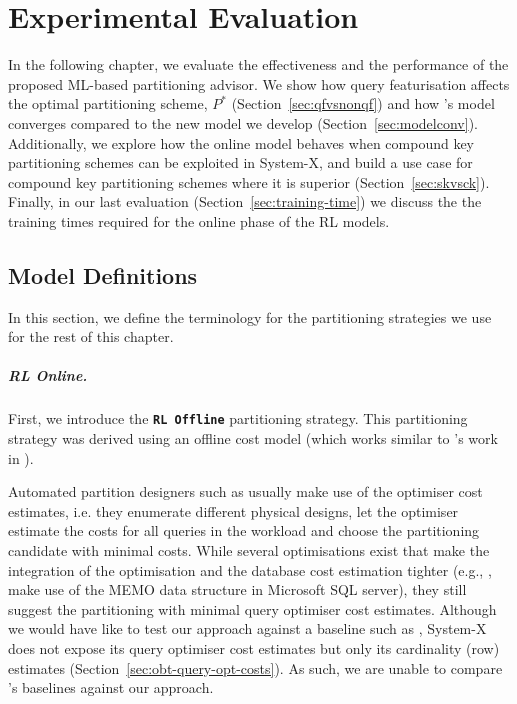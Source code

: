 \chapter{Experimental Evaluation}
\label{chapter:experimental-evaluation}
In the following chapter, we evaluate the effectiveness and the performance of the proposed ML-based partitioning advisor. We show how query featurisation affects the optimal partitioning scheme, $P^*$ (Section~\ref{sec:qfvsnonqf}) and how \citeauthor{Hilprecht:2019:TLP:3329859.3329876}'s model converges compared to the new model we develop (Section~\ref{sec:modelconv}). Additionally, we explore how the online model behaves when compound key partitioning schemes can be exploited in System-X, and build a use case for compound key partitioning schemes where it is superior (Section~\ref{sec:skvsck}). Finally, in our last evaluation (Section~\ref{sec:training-time}) we discuss the the training times required for the online phase of the RL models. 

\section{Model Definitions}
In this section, we define the terminology for the partitioning strategies we use for the rest of this chapter. 

\noindent\paragraph{RL Online.} First, we introduce the \textbf{\texttt{RL Offline}} partitioning strategy. This partitioning strategy was derived using  an offline cost model \cite{DBLP:conf/sigmod/HilprechtBR20} (which works similar to \citeauthor{DBLP:conf/sigmod/NehmeB11}'s work in \cite{DBLP:conf/sigmod/NehmeB11}). 

Automated partition designers such as \cite{DBLP:conf/sigmod/NehmeB11} usually make use of the optimiser cost estimates, i.e. they enumerate different physical designs, let the optimiser estimate the costs for all queries in the workload and choose the partitioning candidate with minimal costs. While several optimisations exist that make the integration of the optimisation and the database cost estimation tighter (e.g., \citeauthor{DBLP:conf/sigmod/NehmeB11}, \cite{DBLP:conf/sigmod/NehmeB11} make
use of the MEMO data structure in Microsoft SQL server),
they still suggest the partitioning with minimal query optimiser cost estimates. Although we would have like to test our approach against a baseline such as \cite{DBLP:conf/sigmod/NehmeB11}, System-X does not expose its query optimiser cost estimates but only its cardinality (row) estimates (Section~\ref{sec:obt-query-opt-costs}). As such, we are unable to compare \citeauthor{DBLP:conf/sigmod/NehmeB11}'s baselines against our approach.

